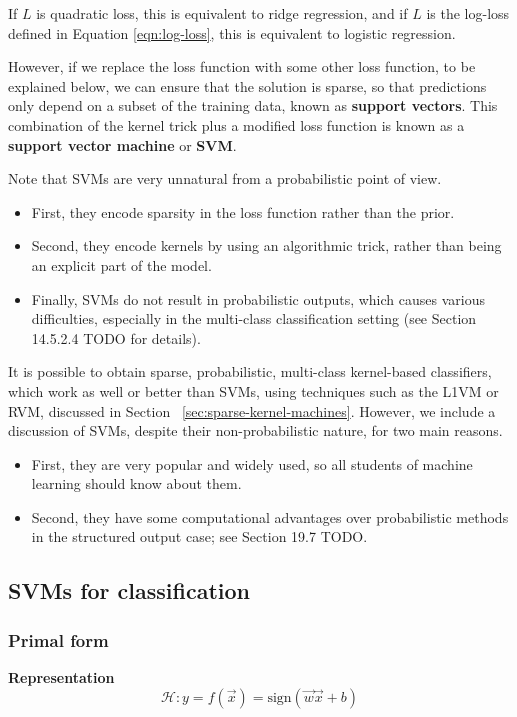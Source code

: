 If $L$ is quadratic loss, this is equivalent to ridge regression, and if $L$ is the log-loss defined in Equation \eqref{eqn:log-loss}, this is equivalent to logistic regression.

However, if we replace the loss function with some other loss function, to be explained below, we can ensure that the solution is sparse, so that predictions only depend on a subset of the training data, known as \textbf{support vectors}. This combination of the kernel trick plus a modified loss function is known as a \textbf{support vector machine} or \textbf{SVM}. 

Note that SVMs are very unnatural from a probabilistic point of view. 
\begin{itemize}
\item{First, they encode sparsity in the loss function rather than the prior.}
\item{Second, they encode kernels by using an algorithmic trick, rather than being an explicit part of the model. }
\item{Finally, SVMs do not result in probabilistic outputs, which causes various difficulties, especially in the multi-class classification setting (see Section 14.5.2.4 TODO for details).}
\end{itemize}

It is possible to obtain sparse, probabilistic, multi-class kernel-based classifiers, which work as well or better than SVMs, using techniques such as the L1VM or RVM, discussed in Section ~\ref{sec:sparse-kernel-machines}. However, we include a discussion of SVMs, despite their non-probabilistic nature, for two main reasons. 
\begin{itemize}
\item{First, they are very popular and widely used, so all students of machine learning should know about them.}
\item{Second, they have some computational advantages over probabilistic methods in the structured output case; see Section 19.7 TODO.}
\end{itemize}


\subsection{SVMs for classification}


\subsubsection{Primal form}
\textbf{Representation}
\begin{equation}
\mathcal{H}:y=f(\vec{x})=\text{sign}(\vec{w}\vec{x}+b)
\end{equation}

